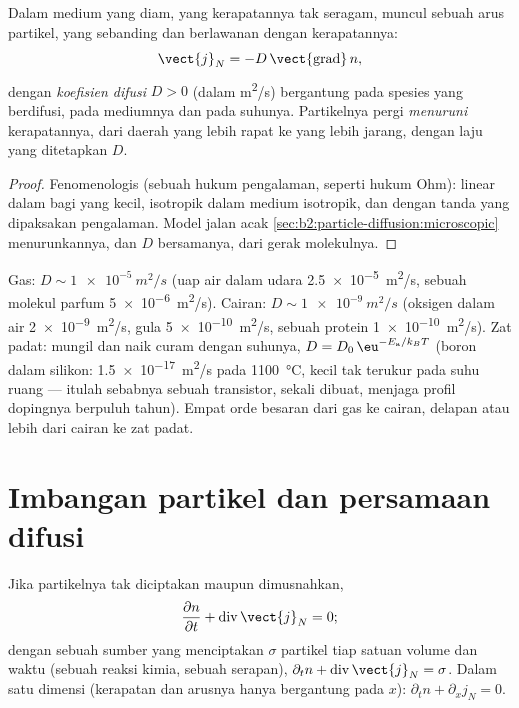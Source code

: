 \begin{theorem}\label{thm:b2:particle-diffusion:fick}
Dalam medium yang diam, yang kerapatannya tak seragam, muncul sebuah arus
partikel, yang sebanding dan berlawanan dengan 
kerapatannya:
\[
\vect{j}_N = -D\,\vect{\operatorname{grad}}\,n ,
\]
dengan \emph{koefisien difusi}
$D > 0$ (dalam \unit{m^2/s}) bergantung pada spesies yang berdifusi, pada
mediumnya dan pada suhunya. Partikelnya pergi \emph{menuruni} 
kerapatannya, dari daerah yang lebih rapat ke yang lebih jarang, dengan laju yang ditetapkan $D$.
\end{theorem}

\begin{proof}
Fenomenologis (sebuah hukum pengalaman, seperti hukum Ohm): linear dalam
 bagi  yang kecil, isotropik dalam medium isotropik, dan
dengan tanda yang dipaksakan pengalaman. Model jalan acak
\cref{sec:b2:particle-diffusion:microscopic} menurunkannya, dan $D$ bersamanya,
dari gerak molekulnya.
\end{proof}

\begin{example}\label{ex:b2:particle-diffusion:orders}
Gas: $D \sim \qty{1e-5}{m^2/s}$ (uap air dalam udara
\qty{2.5e-5}{m^2/s}, sebuah molekul parfum \qty{5e-6}{m^2/s}). Cairan:
$D \sim \qty{1e-9}{m^2/s}$ (oksigen dalam air \qty{2e-9}{m^2/s}, gula
\qty{5e-10}{m^2/s}, sebuah protein \qty{1e-10}{m^2/s}). Zat padat: mungil dan
naik curam dengan suhunya, $D = D_0\,\eu^{-E_{\text{a}}/k_BT}$
(boron dalam silikon: \qty{1.5e-17}{m^2/s} pada \qty{1100}{\celsius},
kecil tak terukur pada suhu ruang --- itulah sebabnya sebuah transistor,
sekali dibuat, menjaga profil dopingnya berpuluh tahun). Empat orde
besaran dari gas ke cairan, delapan atau lebih dari cairan ke zat padat.
\end{example}

\section{Imbangan partikel dan persamaan difusi}

\begin{theorem}\label{thm:b2:particle-diffusion:balance}
Jika partikelnya tak diciptakan maupun dimusnahkan,
\[
\frac{\partial n}{\partial t} + \operatorname{div}\vect{j}_N = 0 ;
\]
dengan sebuah sumber yang menciptakan $\sigma$ partikel tiap satuan volume dan waktu
(sebuah reaksi kimia, sebuah serapan), $\partial_t n +
\operatorname{div}\vect{j}_N = \sigma$. Dalam satu dimensi (kerapatan dan
arusnya hanya bergantung pada $x$): $\partial_t n + \partial_x j_N = 0$.
\end{theorem}

